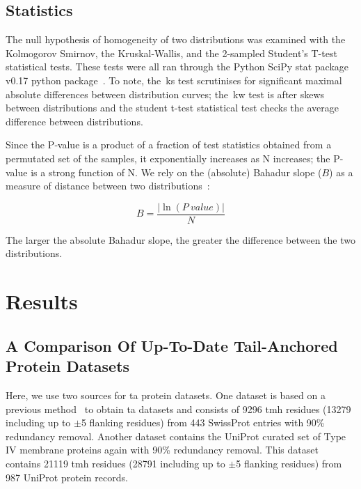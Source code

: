 \subsection{Statistics}

The null hypothesis of homogeneity of two distributions was examined with the Kolmogorov Smirnov, the Kruskal-Wallis, and the 2-sampled Student's T-test statistical tests.
These tests were all ran through the Python SciPy stat package v0.17 python package~\cite{VanderWalt2011}.
To note, the~\gls{ks} test scrutinises for significant maximal absolute differences between distribution curves; the~\gls{kw} test is after skews between distributions and the student t-test statistical test checks the average difference between distributions.

Since the P‑value is a product of a fraction of test statistics obtained from a permutated set of the samples, it exponentially increases as N increases; the P-value is a strong function of N.
We rely on the (absolute) Bahadur slope ($B$) as a measure of distance between two distributions~\cite{Bahadur1967, Bahadur1971, Sunyaev1998, Baker2017}:

\begin{equation} \label{eq:bahadur2}
B=\frac{|\ln(P~value)|}{N}
\end{equation}

The larger the absolute Bahadur slope, the greater the difference between the two distributions.


\section{Results}

\subsection{A Comparison Of Up-To-Date Tail-Anchored Protein Datasets}
Here, we use two sources for \gls{ta} protein datasets.
One dataset is based on a previous method~\cite{Kalbfleisch2007} to obtain \gls{ta} datasets and consists of 9296 \gls{tmh} residues (13279 including up to $\pm$5 flanking residues) from 443 SwissProt entries with 90\% redundancy removal.
Another dataset contains the UniProt curated set of Type IV membrane proteins again with 90\% redundancy removal.
This dataset contains 21119 \gls{tmh} residues (28791 including up to $\pm$5 flanking residues) from 987 UniProt protein records.


